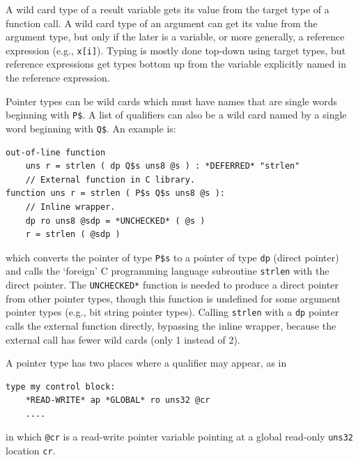\documentclass[12pt]{article}
\newenvironment{indpar}[1][0.3in]%
	{\begin{list}{}%
		     {\setlength{\itemsep}{0in}%
		      \setlength{\topsep}{0in}%
		      \setlength{\parsep}{1ex}%
		      \setlength{\labelwidth}{#1}%
		      \setlength{\leftmargin}{#1}%
		      \addtolength{\leftmargin}{\labelsep}}%
	 \item}%
	{\end{list}}
\begin{document}
A wild card type of a result variable gets its value from the
target type of a function call.  A wild card type of an argument
can get its value from the argument type, but only if the
later is a variable, or more generally, a reference expression
(e.g., {\tt x[i]}).
Typing is mostly done top-down using target types, but reference
expressions get types bottom up from the variable explicitly named
in the reference expression.

Pointer types can be wild cards which must have names that are
single words beginning with {\tt P\$}.  A list of qualifiers
can also be a wild card named by a single word beginning with
{\tt Q\$}.  An example is:

\begin{indpar}\begin{verbatim}
out-of-line function
    uns r = strlen ( dp Q$s uns8 @s ) : *DEFERRED* "strlen"
    // External function in C library.
function uns r = strlen ( P$s Q$s uns8 @s ):
    // Inline wrapper.
    dp ro uns8 @sdp = *UNCHECKED* ( @s )
    r = strlen ( @sdp )
\end{verbatim}\end{indpar}

which converts the pointer of type {\tt P\$s} to a pointer of
type {\tt dp} (direct pointer) and calls the `foreign' C programming
language subroutine {\tt strlen} with the direct pointer.
The {\tt *UNCHECKED*} function is needed to produce a direct pointer
from other pointer types, though this function is undefined
for some argument pointer types (e.g., bit string pointer types).
Calling {\tt strlen} with a {\tt dp} pointer calls the external
function directly, bypassing the inline wrapper, because the
external call has fewer wild cards (only 1 instead of 2).

A pointer type
has two places where a qualifier may appear, as in
\begin{indpar}\begin{verbatim}
type my control block:
    *READ-WRITE* ap *GLOBAL* ro uns32 @cr
    ....
\end{verbatim}\end{indpar}
in which {\tt @cr} is a read-write pointer variable pointing at a global
read-only {\tt uns32} location {\tt cr}.
\end{document}
